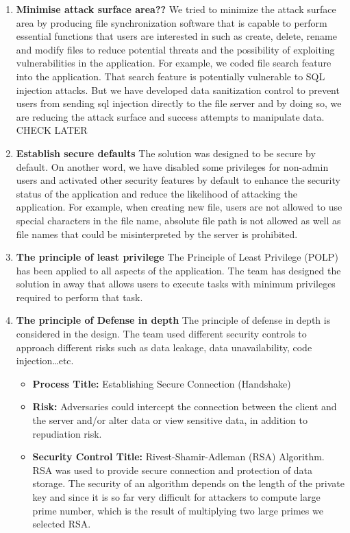 \documentclass{article}
\begin{document}
\begin{enumerate}
\item \textbf{Minimise attack surface area??}
We tried to minimize the attack surface area by producing file synchronization software that is capable to perform essential functions that users are interested in  such as create, delete, rename and modify files to reduce potential threats and the possibility of exploiting vulnerabilities in the application.
For example, we coded file search feature into the application. That search feature is potentially vulnerable to SQL injection attacks. But we have developed data sanitization control to prevent users from sending sql injection directly to the file server and by doing so, we are reducing the attack surface and success attempts to manipulate data. CHECK LATER
\item \textbf{Establish secure defaults}
The solution was designed to be secure by default. On another word, we have disabled some privileges for non-admin users and activated other security features by default to enhance the security status of the application and reduce the likelihood of attacking the application. For example, when creating new file, users are not allowed to use special characters in the file name, absolute file path is not allowed as well as file names that could be misinterpreted by the server is prohibited.
\item \textbf{The principle of least privilege}
The Principle of Least Privilege (POLP) has been applied to all aspects of the application. The team has designed the solution in away that allows users to execute tasks with minimum privileges required to perform that task.
\item \textbf{The principle of Defense in depth}
The principle of defense in depth is considered in the design. The team used different security controls to approach different risks such as data leakage, data unavailability, code injection…etc.
\begin{itemize}
\item \textbf{Process Title:} Establishing Secure Connection (Handshake)
\item \textbf{Risk:} Adversaries could intercept the connection between the client and the server and/or alter data or view sensitive data, in addition to repudiation risk.
\item \textbf{Security Control Title:} Rivest-Shamir-Adleman (RSA) Algorithm. RSA was used to provide secure connection and protection of data storage. The security of an algorithm depends on the length of the private key and since it is so far very difficult for attackers to compute large prime number, which is the result of multiplying two large primes we selected RSA.


\end{itemize}
\end{enumerate}
\end{document}
